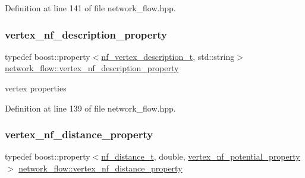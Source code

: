 Definition at line 141 of file network\+\_\+flow.\+hpp.

\mbox{\label{classnetwork__flow_afc0f1529b8715e4c4e04599e3c4dc74e}} 
\subsubsection{\texorpdfstring{vertex\+\_\+nf\+\_\+description\+\_\+property}{vertex\_nf\_description\_property}}
{\footnotesize\ttfamily typedef boost\+::property$<$\hyperlink{structnetwork__flow_1_1nf__vertex__description__t}{nf\+\_\+vertex\+\_\+description\+\_\+t}, std\+::string$>$ \hyperlink{classnetwork__flow_afc0f1529b8715e4c4e04599e3c4dc74e}{network\+\_\+flow\+::vertex\+\_\+nf\+\_\+description\+\_\+property}\hspace{0.3cm}{\ttfamily [private]}}



vertex properties 



Definition at line 139 of file network\+\_\+flow.\+hpp.

\mbox{\label{classnetwork__flow_a780d1139b4f0ab312b68f45134af86c5}} 
\subsubsection{\texorpdfstring{vertex\+\_\+nf\+\_\+distance\+\_\+property}{vertex\_nf\_distance\_property}}
{\footnotesize\ttfamily typedef boost\+::property$<$\hyperlink{structnetwork__flow_1_1nf__distance__t}{nf\+\_\+distance\+\_\+t}, double, \hyperlink{classnetwork__flow_a7af7fd0fcbf29616fd8f9b9ffcdd896a}{vertex\+\_\+nf\+\_\+potential\+\_\+property}$>$ \hyperlink{classnetwork__flow_a780d1139b4f0ab312b68f45134af86c5}{network\+\_\+flow\+::vertex\+\_\+nf\+\_\+distance\+\_\+property}\hspace{0.3cm}{\ttfamily [private]}}



